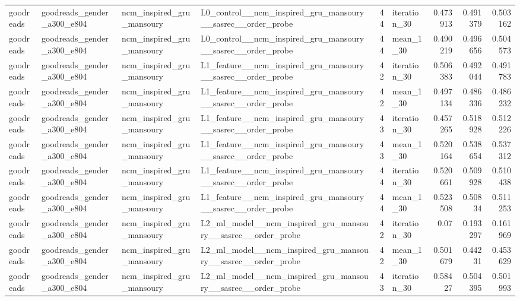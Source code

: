 \begin{table}[htbp!]
\begin{tabular}{llllrlrrr}
goodreads & goodreads\_gender\_a300\_e804 & ncm\_inspired\_gru\_mansoury & L0\_control\_\_ncm\_inspired\_gru\_mansoury\_\_sasrec\_\_order\_probe & 44 & iteration\_30 & 0.473913 & 0.491379 & 0.503162 \\
goodreads & goodreads\_gender\_a300\_e804 & ncm\_inspired\_gru\_mansoury & L0\_control\_\_ncm\_inspired\_gru\_mansoury\_\_sasrec\_\_order\_probe & 44 & mean\_1\_30 & 0.490219 & 0.496656 & 0.504573 \\
goodreads & goodreads\_gender\_a300\_e804 & ncm\_inspired\_gru\_mansoury & L1\_feature\_\_ncm\_inspired\_gru\_mansoury\_\_sasrec\_\_order\_probe & 42 & iteration\_30 & 0.506383 & 0.492044 & 0.491783 \\
goodreads & goodreads\_gender\_a300\_e804 & ncm\_inspired\_gru\_mansoury & L1\_feature\_\_ncm\_inspired\_gru\_mansoury\_\_sasrec\_\_order\_probe & 42 & mean\_1\_30 & 0.497134 & 0.486336 & 0.486232 \\
goodreads & goodreads\_gender\_a300\_e804 & ncm\_inspired\_gru\_mansoury & L1\_feature\_\_ncm\_inspired\_gru\_mansoury\_\_sasrec\_\_order\_probe & 43 & iteration\_30 & 0.457265 & 0.518928 & 0.512226 \\
goodreads & goodreads\_gender\_a300\_e804 & ncm\_inspired\_gru\_mansoury & L1\_feature\_\_ncm\_inspired\_gru\_mansoury\_\_sasrec\_\_order\_probe & 43 & mean\_1\_30 & 0.520164 & 0.538654 & 0.537312 \\
goodreads & goodreads\_gender\_a300\_e804 & ncm\_inspired\_gru\_mansoury & L1\_feature\_\_ncm\_inspired\_gru\_mansoury\_\_sasrec\_\_order\_probe & 44 & iteration\_30 & 0.520661 & 0.509928 & 0.510438 \\
goodreads & goodreads\_gender\_a300\_e804 & ncm\_inspired\_gru\_mansoury & L1\_feature\_\_ncm\_inspired\_gru\_mansoury\_\_sasrec\_\_order\_probe & 44 & mean\_1\_30 & 0.523508 & 0.50834 & 0.511253 \\
goodreads & goodreads\_gender\_a300\_e804 & ncm\_inspired\_gru\_mansoury & L2\_ml\_model\_\_ncm\_inspired\_gru\_mansoury\_\_sasrec\_\_order\_probe & 42 & iteration\_30 & 0.07 & 0.193297 & 0.161969 \\
goodreads & goodreads\_gender\_a300\_e804 & ncm\_inspired\_gru\_mansoury & L2\_ml\_model\_\_ncm\_inspired\_gru\_mansoury\_\_sasrec\_\_order\_probe & 42 & mean\_1\_30 & 0.501679 & 0.44231 & 0.453629 \\
goodreads & goodreads\_gender\_a300\_e804 & ncm\_inspired\_gru\_mansoury & L2\_ml\_model\_\_ncm\_inspired\_gru\_mansoury\_\_sasrec\_\_order\_probe & 43 & iteration\_30 & 0.58427 & 0.504395 & 0.501993 \\

\end{tabular}
\end{table}
